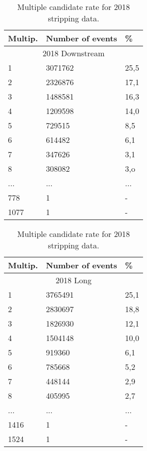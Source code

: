 \begin{table}[h!]
\begin{center}
\begin{tabular}{ p{2.6cm}p{3.1cm}p{0.6cm} }
\hline
\hline
Multip.  & Number of events & \% \\
\hline
    \multicolumn{3}{c}{2018 Downstream}\\
\hline

     1    & 3071762	& 25,5 \\
     2    & 2326876	& 17,1 \\
     3    & 1488581	& 16,3 \\
     4    & 1209598	& 14,0 \\
     5    & 729515	& 8,5 \\
     6    & 614482	& 6,1 \\
     7    & 347626	& 3,1 \\
     8    & 308082	& 3,o \\
    ...   &   ...  &  ... \\
    778  &    1 & -   \\
    1077  &    1 & -   \\

\hline
\end{tabular}
\quad
\begin{tabular}{ p{2.6cm}p{3.1cm}p{0.6cm} }
\hline
\hline
Multip.  & Number of events & \% \\
\hline
    \multicolumn{3}{c}{2018 Long}\\
\hline
     1    & 3765491	& 25,1 \\
     2    & 2830697	& 18,8  \\
     3    & 1826930	& 12,1 \\
     4    & 1504148	& 10,0 \\
     5    & 919360	& 6,1 \\
     6    & 785668	& 5,2 \\
     7    & 448144	& 2,9  \\
     8    & 405995	& 2,7  \\
    ...   &   ...  &  ... \\
    1416  &    1 & -   \\
    1524  &    1 & -    \\
    
\hline
\end{tabular}
\caption{Multiple candidate rate for 2018 stripping data.}
\label{tab:multi2018raw}
\end{center}
\end{table}%


